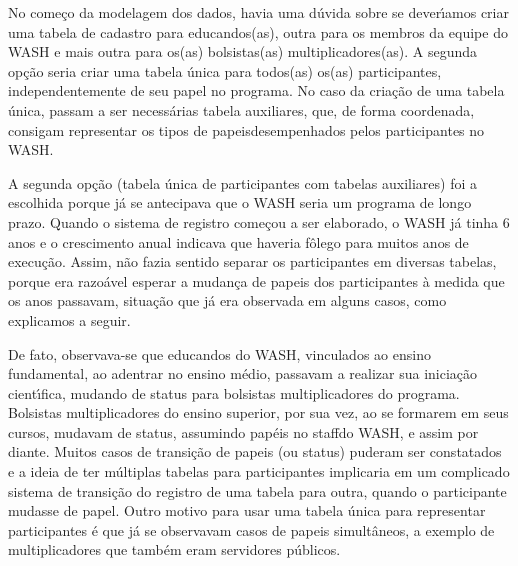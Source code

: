 \documentclass[
12pt,		%
openright,	%
twoside,  %
a4paper,			%
chapter=TITLE,		%
english,			%
french,				%
spanish,			%
brazil				%
]{USPSC-classe/USPSC}
\begin{document}
No come\c{c}o da modelagem dos dados, havia uma d\'uvida sobre se dever\'{\i}amos criar uma tabela de cadastro para educandos(as), outra para os membros da equipe do WASH e mais outra para os(as) bolsistas(as) multiplicadores(as). A segunda op\c{c}\~ao seria criar uma tabela \'unica para todos(as) os(as) participantes, independentemente de seu papel no programa. No caso da cria\c{c}\~ao de uma tabela \'unica, passam a ser necess\'arias tabela auxiliares, que, de forma coordenada, consigam representar os \textquotedbl tipos de papeis\textquotedbl   desempenhados pelos participantes no WASH.










A segunda op\c{c}\~ao (tabela \'unica de participantes com tabelas auxiliares) foi a escolhida porque j\'a se antecipava que o WASH seria um programa de longo prazo. Quando o sistema de registro come\c{c}ou a ser elaborado, o WASH j\'a tinha 6 anos e o crescimento anual indicava que haveria f\^olego para muitos anos de execu\c{c}\~ao. Assim, n\~ao fazia sentido separar os participantes em diversas tabelas, porque era razo\'avel esperar a mudan\c{c}a de papeis dos participantes \`a medida que os anos passavam, situa\c{c}\~ao que j\'a era observada em alguns casos, como explicamos a seguir.










De fato, observava-se que educandos do WASH, vinculados ao ensino fundamental, ao adentrar no ensino m\'edio, passavam a realizar sua inicia\c{c}\~ao cient\'{\i}fica, mudando de status para bolsistas multiplicadores do programa. Bolsistas multiplicadores do ensino superior, por sua vez, ao se formarem em seus cursos, mudavam de status, assumindo pap\'eis no  \textquotedbl staff\textquotedbl  do WASH, e assim por diante. Muitos casos de transi\c{c}\~ao de papeis (ou \textquotedbl status\textquotedbl ) puderam ser constatados e a ideia de ter m\'ultiplas tabelas para participantes implicaria em um complicado sistema de transi\c{c}\~ao do registro de uma tabela para outra, quando o participante mudasse de papel. Outro motivo para usar uma tabela \'unica para representar participantes \'e que j\'a se observavam casos de papeis simult\^aneos, a exemplo de multiplicadores que tamb\'em eram servidores p\'ublicos.
\end{document}

